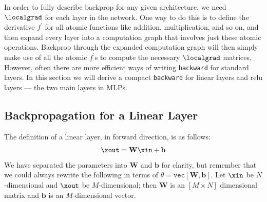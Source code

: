 
In order to fully describe backprop for any given architecture, we need $\localgrad$ for each layer in the network. One way to do this is to define the derivative $f^{\prime}$ for all atomic functions like addition, multiplication, and so on, and then expand every layer into a computation graph that involves just these atomic operations. Backprop through the expanded computation graph will then simply make use of all the atomic $f^{\prime}$s to compute the necessary $\localgrad$ matrices. However, often there are more efficient ways of writing \texttt{backward} for standard layers. In this section we will derive a compact \texttt{backward} for linear layers and relu layers — the two main layers in MLPs.

\subsection{Backpropagation for a Linear Layer}

The definition of a linear layer, in forward direction, is as follows:
\begin{align}
    \xout = \mathbf{W} \xin + \mathbf{b}
\end{align}
We have separated the parameters into $\mathbf{W}$ and $\mathbf{b}$ for clarity, but remember that we could always rewrite the following in terms of $\theta = \texttt{vec}[\mathbf{W}, \mathbf{b}]$. Let $\xin$ be $N$-dimensional and $\xout$ be $M$-dimensional; then $\mathbf{W}$ is an $[M \times N]$ dimensional matrix and $\mathbf{b}$ is an $M$-dimensional vector.

